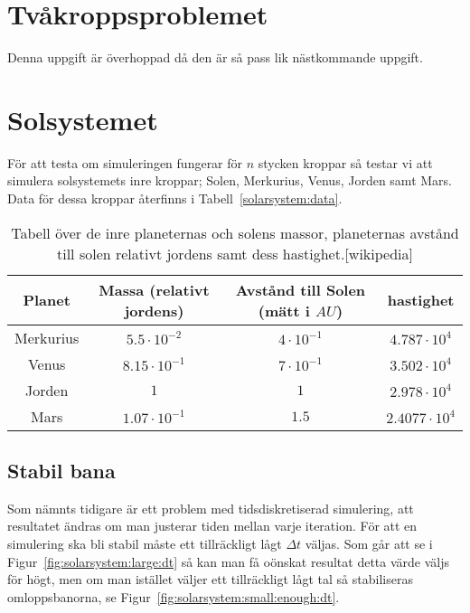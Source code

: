 \documentclass[a4]{article}
\begin{document}
\section{Tvåkroppsproblemet}
Denna uppgift är överhoppad då den är så pass lik nästkommande uppgift.

\section{Solsystemet}
För att testa om simuleringen fungerar för $n$ stycken kroppar så testar vi att
simulera solsystemets inre kroppar; Solen, Merkurius, Venus, Jorden samt Mars.
Data för dessa kroppar återfinns i Tabell~\vref{solarsystem:data}.

\begin{table}
\begin{center}
\begin{tabular}{c|c|c|c}
	Planet    & Massa (relativt jordens) & Avstånd till Solen (mätt i $AU$) & hastighet\\
	\hline
	Merkurius & $5.5 \cdot 10^{-2}$  & $4 \cdot 10^{-1}$  &  $4.787 \cdot 10^4$ \\
	Venus     & $8.15 \cdot 10^{-1}$ & $7 \cdot 10^{-1}$  &  $3.502 \cdot 10^4$ \\ 
	Jorden    & $1$                  & $1$                &  $2.978 \cdot 10^4$ \\
	Mars      & $1.07 \cdot 10^{-1}$ & $1.5$              &  $2.4077 \cdot 10^4$
\end{tabular}
\caption{
	Tabell över de inre planeternas och solens massor, planeternas avstånd till
	solen relativt jordens samt dess hastighet.[wikipedia]
}
\label{solarsystem:data}
\end{center}
\end{table}
	

		\subsection{Stabil bana}
Som nämnts tidigare är ett problem med tidsdiskretiserad simulering, att
resultatet ändras om man justerar tiden mellan varje iteration.
För att en simulering ska bli stabil måste ett tillräckligt lågt $\Delta t$
väljas.
Som går att se i Figur~\vref{fig:solarsystem:large:dt} så kan man få oönskat
resultat detta värde väljs för högt, men om man istället väljer ett
tillräckligt lågt tal så stabiliseras omloppsbanorna, se
Figur~\vref{fig:solarsystem:small:enough:dt}.

\end{document}
